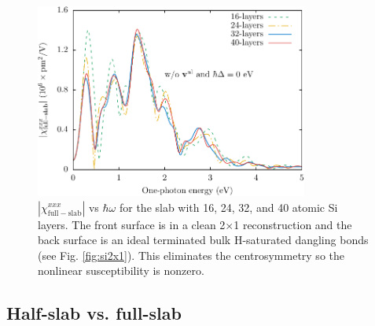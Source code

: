 \documentclass[11pt]{book}
\begin{document}
\begin{figure}
\centering 
\includegraphics[width=0.8\textwidth]{../figures/04-results/fig-4_1_02}
\caption{$|\chi_{\mathrm{full-slab}}^{xxx}|$ vs $\hbar\omega$
for the slab with 16, 24, 32, and 40 atomic Si layers. The front surface is in a
clean 2$\times$1 reconstruction and the back surface is an ideal terminated bulk
H-saturated dangling bonds (see Fig. \ref{fig:si2x1}). This eliminates the
centrosymmetry so the nonlinear susceptibility is nonzero.
\label{fig:layersconv}}
\end{figure}



\subsection{Half-slab vs. full-slab}
\end{document}
